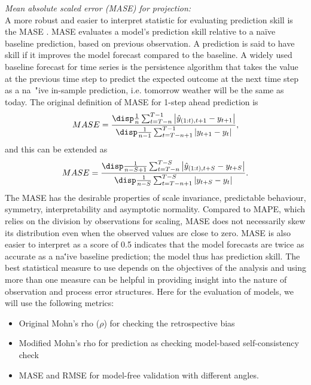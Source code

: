 \vspace{0.2cm} \noindent
{\it Mean absolute scaled error (MASE) for projection:}\\ 
A more robust and easier to interpret statistic for evaluating prediction skill is the MASE \parencite{hyndman2006another}. MASE evaluates a model's prediction skill relative to a na\" {i}ve baseline prediction, based on previous observation. A prediction is said to have skill if it improves the model forecast compared to the baseline. A widely used baseline forecast for time series is the persistence algorithm that takes the value at the previous time step to predict the expected outcome at the next time step as a na\ "{i}ve in-sample prediction, i.e. tomorrow weather will be the same as today. The original definition of MASE for 1-step ahead prediction is 
\begin{equation}
\label{eqn:mase}
{MASE=\frac{\disp \frac{1}{n} \sum_{t=T-n}^{T-1} \left| \hat{y}_{(1:t),t+1}-y_{t+1} \right|}
{\disp \frac{1}{n-1} \sum_{t=T-n+1}^{T-1} \left|y_{t+1}-y_{t}\right|}}, 
\end{equation}
and this can be extended as 
\begin{equation}
MASE=
\frac{\disp \frac{1}{n-S+1} \sum_{t=T-n}^{T-S}  \left| \hat{y}_{(1:t),t+S}-y_{t+S} \right|}
{\disp \frac{1}{n-S} \sum_{t=T-n+1}^{T-S} \left|y_{t+S}-y_{t}\right|}. 
\end{equation} 
The MASE has the desirable properties of scale invariance, predictable behaviour, symmetry, interpretability and asymptotic normality. Compared to MAPE, which relies on the division by observations for scaling, MASE does not necessarily skew its distribution even when the observed values are close to zero. MASE is also easier to interpret as a score of 0.5 indicates that the model forecasts are twice as accurate as a na\''{i}ve baseline prediction; the model thus has prediction skill.
\vspace{0.2cm} 
The best statistical measure to use depends on the objectives of the analysis and using more than one measure can be helpful in providing insight into the nature of observation and process error structures. Here for the evaluation of models, we will use the following metrics: 

\begin{itemize}
\item Original Mohn's rho ($\rho$) for checking the retrospective bias \\
\vspace{-0.3cm}
\item Modified Mohn's rho for prediction  as checking model-based self-consistency check \\
\vspace{-0.3cm}
\item MASE and RMSE for model-free validation with different angles. 
\end{itemize}
